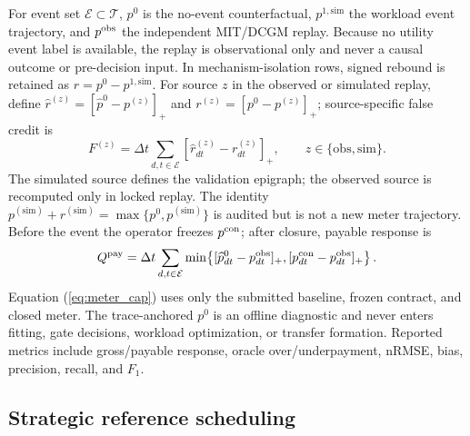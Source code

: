 \documentclass[10pt,journal]{IEEEtran}
\newcommand{\dt}{\Delta t}
\begin{document}
For event set $\mathcal E\subset\mathcal T$, $p^0$ is the no-event
counterfactual, $p^{1,\mathrm{sim}}$ the workload event trajectory, and
$p^{\rm obs}$ the independent MIT/DCGM replay. Because no utility event label is
available, the replay is observational only and never a causal outcome or
pre-decision input. In mechanism-isolation rows, signed rebound is retained as
\(r=p^0-p^{1,\mathrm{sim}}\).
For source $z$ in the observed or simulated replay, define
$\widehat r^{(z)}=[\widehat p^0-p^{(z)}]_+$ and
$r^{(z)}=[p^0-p^{(z)}]_+$; source-specific false credit is
\begin{equation}
 F^{(z)}=\dt\sum_{d,t\in\mathcal E}
 [\widehat r^{(z)}_{dt}-r^{(z)}_{dt}]_+,
 \qquad z\in\{\mathrm{obs},\mathrm{sim}\}.
 \label{eq:falsecredit}
\end{equation}
The simulated source defines the validation epigraph; the observed source is
recomputed only in locked replay. The identity
\(p^{(\mathrm{sim})}+r^{(\mathrm{sim})}=\max\{p^0,p^{(\mathrm{sim})}\}\) is audited
but is not a new meter trajectory. Before the event the operator freezes
\(p^{\rm con}\); after closure, payable response is
\begin{equation}
Q^{\rm pay}=\dt\sum_{d,t\in\mathcal E}
\min\!\left\{[\widehat p^0_{dt}-p^{\rm obs}_{dt}]_+,
 [p^{\rm con}_{dt}-p^{\rm obs}_{dt}]_+\right\}.
\label{eq:meter_cap}
\end{equation}
Equation (\ref{eq:meter_cap}) uses only the submitted baseline, frozen contract,
and closed meter. The trace-anchored $p^0$ is an offline diagnostic and never
enters fitting, gate decisions, workload optimization, or transfer formation.
Reported metrics include gross/payable response, oracle over/underpayment,
nRMSE, bias, precision, recall, and $F_1$.

\subsection{Strategic reference scheduling}
\end{document}
